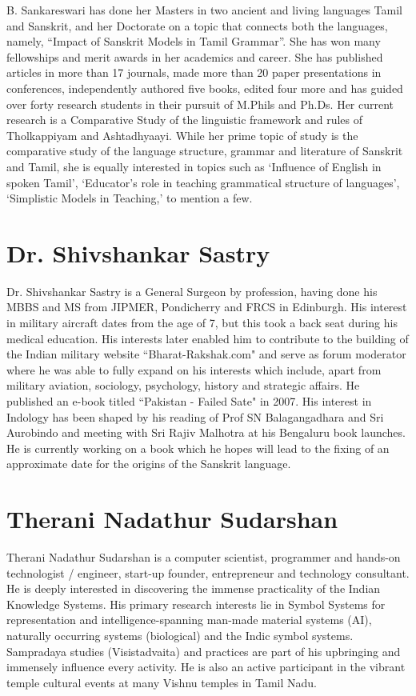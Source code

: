 B. Sankareswari has done her Masters in two ancient and living languages Tamil and Sanskrit, and her Doctorate on a topic that connects both the languages, namely, “Impact of Sanskrit Models in Tamil Grammar”. She has won many fellowships and merit awards in her academics and career. She has published articles in more than 17 journals, made more than 20 paper presentations in conferences, independently authored five books, edited four more and has guided over forty research students in their pursuit of M.Phils and Ph.Ds. Her current research is a Comparative Study of the linguistic framework and rules of Tholkappiyam and Ashtadhyaayi. While her prime topic of study is the comparative study of the language structure, grammar and literature of Sanskrit and Tamil, she is equally interested in topics such as ‘Influence of English in spoken Tamil’, ‘Educator’s role in teaching grammatical structure of languages’, ‘Simplistic Models in Teaching,’ to mention a few.

\section*{Dr. Shivshankar Sastry}

Dr. Shivshankar Sastry is a General Surgeon by profession, having done his MBBS and MS from JIPMER, Pondicherry and FRCS in Edinburgh. His interest in military aircraft dates from the age of 7, but this took a back seat during his medical education. His interests later enabled him to contribute to the building of the Indian military website ``Bharat-Rakshak.com" and serve as forum moderator where he was able to fully expand on his interests which include, apart from military aviation, sociology, psychology, history and strategic affairs. He published an e-book titled ``Pakistan - Failed Sate" in 2007. His interest in Indology has been shaped by his reading of Prof SN Balagangadhara and Sri Aurobindo and meeting with Sri Rajiv Malhotra at his Bengaluru book launches. He is currently working on a book which he hopes will lead to the fixing of an approximate date for the origins of the Sanskrit language.

\section*{Therani Nadathur Sudarshan}

Therani Nadathur Sudarshan is a computer scientist, programmer and hands-on technologist / engineer, start-up founder, entrepreneur and technology consultant. He is deeply interested in discovering the immense practicality of the Indian Knowledge Systems. His primary\break
 research interests lie in Symbol Systems for representation and\break
 intelligence-spanning man-made material systems (AI), naturally occurring systems (biological) and the Indic symbol systems. Sampradaya studies (Visistadvaita) and practices are part of his upbringing and immensely influence every activity. He is also an active participant in the vibrant temple cultural events at many Vishnu temples in Tamil Nadu.

